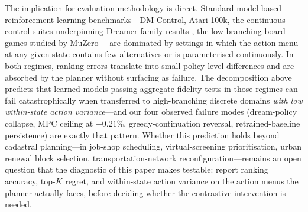 \documentclass[11pt]{article}
\begin{document}
The implication for evaluation methodology is direct. Standard model-based reinforcement-learning benchmarks---DM Control, Atari-100k, the continuous-control suites underpinning Dreamer-family results \citep{hafner2025dreamerv3,hansen2024tdmpc2}, the low-branching board games studied by MuZero \citep{schrittwieser2020muzero}---are dominated by settings in which the action menu at any given state contains few alternatives or is parameterised continuously. In both regimes, ranking errors translate into small policy-level differences and are absorbed by the planner without surfacing as failure. The decomposition above predicts that learned models passing aggregate-fidelity tests in those regimes can fail catastrophically when transferred to high-branching discrete domains \emph{with low within-state action variance}---and our four observed failure modes (dream-policy collapse, MPC ceiling at $-0.21\%$, greedy-continuation reversal, retrained-baseline persistence) are exactly that pattern. Whether this prediction holds beyond cadastral planning---in job-shop scheduling, virtual-screening prioritisation, urban renewal block selection, transportation-network reconfiguration---remains an open question that the diagnostic of this paper makes testable: report ranking accuracy, top-$K$ regret, and within-state action variance on the action menus the planner actually faces, before deciding whether the contrastive intervention is needed.

\end{document}
